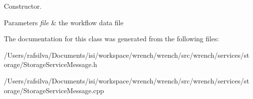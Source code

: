 Constructor. 


\begin{DoxyParams}{Parameters}
{\em file} & the workflow data file \\
\hline
\end{DoxyParams}


The documentation for this class was generated from the following files\+:\begin{DoxyCompactItemize}
\item 
/\+Users/rafsilva/\+Documents/isi/workspace/wrench/wrench/src/wrench/services/storage/Storage\+Service\+Message.\+h\item 
/\+Users/rafsilva/\+Documents/isi/workspace/wrench/wrench/src/wrench/services/storage/Storage\+Service\+Message.\+cpp\end{DoxyCompactItemize}
